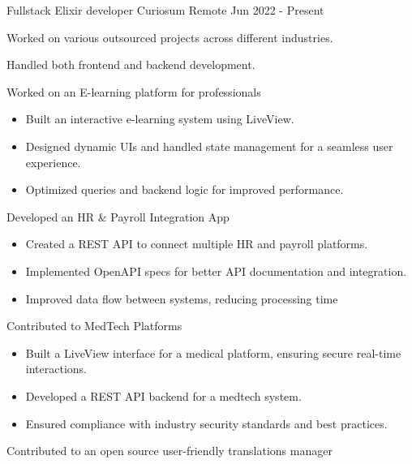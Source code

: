 

\begin{cventries}

  \cventry
    {Fullstack Elixir developer} %
    {Curiosum} %
    {Remote} %
    {Jun 2022 - Present} %
    {
      \begin{cvitems} %
        \item {Worked on various outsourced projects across different industries.}
        \item {Handled both frontend and backend development.}
        \item {Worked on an E-learning platform for professionals}
        \begin{itemize}[leftmargin=3.0mm,labelsep=0.8mm,label={--}]
          \item {Built an interactive e-learning system using LiveView.}
          \item {Designed dynamic UIs and handled state management for a seamless user experience.}
          \item {Optimized queries and backend logic for improved performance.}
        \end{itemize}
        \item {Developed an HR \& Payroll Integration App}
        \begin{itemize}[leftmargin=3.0mm,labelsep=0.8mm,label={--}]
          \item {Created a REST API to connect multiple HR and payroll platforms.}
          \item {Implemented OpenAPI specs for better API documentation and integration.}
          \item {Improved data flow between systems, reducing processing time}
        \end{itemize}
        \item {Contributed to MedTech Platforms }
        \begin{itemize}[leftmargin=3.0mm,labelsep=0.8mm,label={--}]
          \item {Built a LiveView interface for a medical platform, ensuring secure real-time interactions.}
          \item {Developed a REST API backend for a medtech system.}
          \item {Ensured compliance with industry security standards and best practices.}
        \end{itemize}
        \item {Contributed to an open source user-friendly translations manager}
      \end{cvitems}
    }


\end{cventries}
